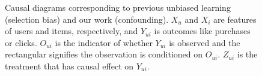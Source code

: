 \documentclass[manuscript,screen]{acmart}
\begin{document}
\begin{figure}[tp]
	\begin{center}
		\caption{
			Causal diagrams corresponding to previous unbiased learning (selection bias) and our work (confounding). 
			$X_{u}$ and $X_{i}$ are features of users and items, respectively, and $Y_{ui}$ is outcomes like purchases or clicks.
			$O_{ui}$ is the indicator of whether $Y_{ui}$ is observed and the rectangular signifies the observation is conditioned on $O_{ui}$.
			$Z_{ui}$ is the treatment that has causal effect on $Y_{ui}$. 
		}
	\label{fig:diagrams}
	\end{center}
\end{figure}
\end{document}
